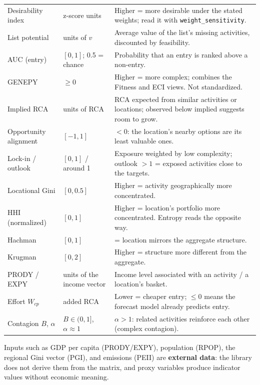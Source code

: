 \documentclass[12pt, a4paper]{article}
\begin{document}
{\begin{longtable}{>{\raggedright\arraybackslash}p{3.4cm}>{\raggedright\arraybackslash}p{3.0cm}>{\raggedright\arraybackslash}p{8.6cm}}
Desirability index & z-score units & Higher = more desirable under the
  stated weights; read it with \texttt{weight\_sensitivity}. \\
List potential & units of $v$ & Average value of the list's missing
  activities, discounted by feasibility. \\
AUC (entry) & $[0, 1]$; 0.5 = chance & Probability that an entry is
  ranked above a non-entry.\\
GENEPY & $\geq 0$ & Higher = more complex; combines the Fitness and ECI
  views. Not standardized. \\
Implied RCA & units of RCA & RCA expected from similar activities or
  locations; observed below implied suggests room to grow. \\
Opportunity alignment & $[-1, 1]$ & $<0$: the location's nearby options
  are its least valuable ones. \\
Lock-in / outlook & $[0,1]$ / around 1 & Exposure weighted by low
  complexity; outlook $>1$ = exposed activities close to the targets. \\
Locational Gini & $[0, 0.5]$ & Higher = activity geographically more
  concentrated. \\
HHI (normalized) & $[0, 1]$ & Higher = location's portfolio more
  concentrated. Entropy reads the opposite way. \\
Hachman & $[0, 1]$ & 1 = location mirrors the aggregate structure. \\
Krugman & $[0, 2]$ & Higher = structure more different from the
  aggregate. \\
PRODY / EXPY & units of the income vector & Income level associated
  with an activity / a location's basket. \\
Effort $W_{cp}$ & added RCA & Lower = cheaper entry; $\leq 0$ means the
  forecast model already predicts entry. \\
Contagion $B$, $\alpha$ & $B \in (0,1]$, $\alpha \approx 1$ &
  $\alpha > 1$: related activities reinforce each other (complex
  contagion). \\
\bottomrule
\end{longtable}}

\begin{warnbox}
  Inputs such as GDP per capita (PRODY/EXPY), population (RPOP), the
  regional Gini vector (PGI), and emissions (PEII) are \textbf{external
  data}: the library does not derive them from the matrix, and proxy
  variables produce indicator values without economic meaning.
\end{warnbox}
\end{document}
